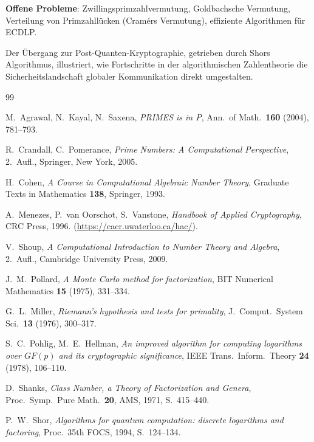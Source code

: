 \documentclass[12pt,a4paper]{amsart}
\theoremstyle{definition}
\begin{document}
\medskip
\noindent\textbf{Offene Probleme}:
Zwillingsprimzahlvermutung, Goldbachsche Vermutung, Verteilung von Primzahllücken
(Cramérs Vermutung), effiziente Algorithmen für ECDLP.

Der Übergang zur Post-Quanten-Kryptographie, getrieben durch Shors Algorithmus,
illustriert, wie Fortschritte in der algorithmischen Zahlentheorie die
Sicherheitslandschaft globaler Kommunikation direkt umgestalten.

\begin{thebibliography}{99}

M.~Agrawal, N.~Kayal, N.~Saxena,
\emph{PRIMES is in P},
Ann.\ of Math.\ \textbf{160} (2004), 781--793.

R.~Crandall, C.~Pomerance,
\emph{Prime Numbers: A Computational Perspective},
2.~Aufl., Springer, New York, 2005.

H.~Cohen,
\emph{A Course in Computational Algebraic Number Theory},
Graduate Texts in Mathematics \textbf{138}, Springer, 1993.

A.~Menezes, P.~van Oorschot, S.~Vanstone,
\emph{Handbook of Applied Cryptography},
CRC Press, 1996. (\url{https://cacr.uwaterloo.ca/hac/}).

V.~Shoup,
\emph{A Computational Introduction to Number Theory and Algebra},
2.~Aufl., Cambridge University Press, 2009.

J.~M.~Pollard,
\emph{A Monte Carlo method for factorization},
BIT Numerical Mathematics \textbf{15} (1975), 331--334.

G.~L.~Miller,
\emph{Riemann's hypothesis and tests for primality},
J.~Comput.\ System Sci.\ \textbf{13} (1976), 300--317.

S.~C.~Pohlig, M.~E.~Hellman,
\emph{An improved algorithm for computing logarithms over $GF(p)$ and its cryptographic significance},
IEEE Trans.\ Inform.\ Theory \textbf{24} (1978), 106--110.

D.~Shanks,
\emph{Class Number, a Theory of Factorization and Genera},
Proc.\ Symp.\ Pure Math.\ \textbf{20}, AMS, 1971, S.~415--440.

P.~W.~Shor,
\emph{Algorithms for quantum computation: discrete logarithms and factoring},
Proc.\ 35th FOCS, 1994, S.~124--134.

\end{thebibliography}
\end{document}
